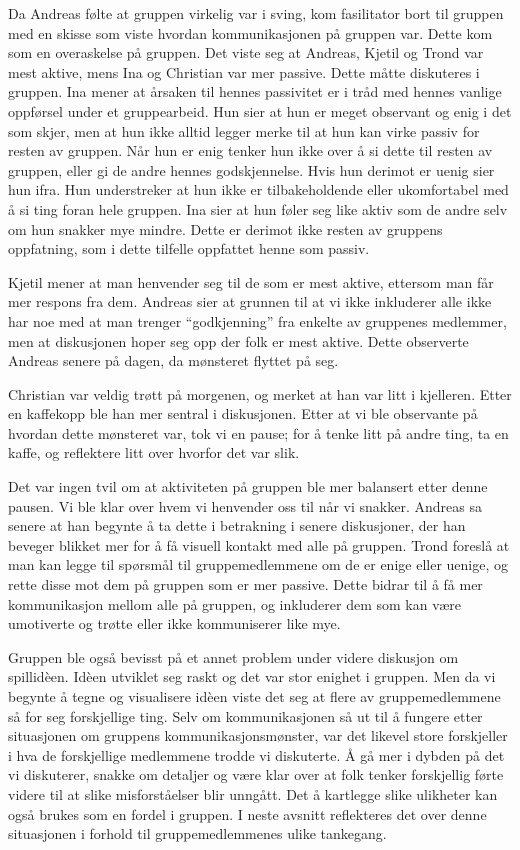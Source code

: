 Da Andreas følte at gruppen virkelig var i sving, kom fasilitator bort til gruppen med en skisse som viste hvordan kommunikasjonen på gruppen var.
Dette kom som en overaskelse på gruppen. Det viste seg at Andreas, Kjetil og Trond var mest aktive, mens Ina og Christian var mer passive. Dette måtte diskuteres i gruppen.
Ina mener at årsaken til hennes passivitet er i tråd med hennes vanlige oppførsel under et gruppearbeid. Hun sier at hun er meget observant og enig i det som skjer, men at hun ikke alltid legger merke til at hun kan virke passiv for resten av gruppen. Når hun er enig tenker hun ikke over å si dette til resten av gruppen, eller gi de andre hennes godskjennelse. Hvis hun derimot er uenig sier hun ifra. Hun understreker at hun ikke er tilbakeholdende eller ukomfortabel med å si ting foran hele gruppen. Ina sier at hun føler seg like aktiv som de andre selv om hun snakker mye mindre. Dette er derimot ikke resten av gruppens oppfatning, som i dette tilfelle oppfattet henne som passiv. 

Kjetil mener at man henvender seg til de som er mest aktive, ettersom man får mer respons fra dem. Andreas sier at grunnen til at vi ikke inkluderer alle ikke har noe med at man trenger “godkjenning” fra enkelte av gruppenes medlemmer, men at diskusjonen hoper seg opp der folk er mest aktive. Dette observerte Andreas senere på dagen, da mønsteret flyttet på seg. 

Christian var veldig trøtt på morgenen, og merket at han var litt i kjelleren. Etter en kaffekopp ble han mer sentral i diskusjonen. Etter at vi ble observante på hvordan dette mønsteret var, tok vi en pause; for å tenke litt på andre ting, ta en kaffe, og reflektere litt over hvorfor det var slik. 

Det var ingen tvil om at aktiviteten på gruppen ble mer balansert etter denne pausen. Vi ble klar over hvem vi henvender oss til når vi snakker. Andreas sa senere at han begynte å ta dette i betrakning i senere diskusjoner, der han beveger blikket mer for å få visuell kontakt med alle på gruppen. Trond foreslå at man kan legge til spørsmål til gruppemedlemmene om de er enige eller uenige, og rette disse mot dem på gruppen som er mer passive. Dette bidrar til å få mer kommunikasjon mellom alle på gruppen, og inkluderer dem som kan være umotiverte og trøtte eller ikke kommuniserer like mye. 

Gruppen ble også bevisst på et annet problem under videre diskusjon om spillidèen. Idèen utviklet seg raskt og det var stor enighet i gruppen. Men da vi begynte å tegne og visualisere idèen viste det seg at flere av gruppemedlemmene så for seg forskjellige ting. Selv om kommunikasjonen så ut til å fungere etter situasjonen om gruppens kommunikasjonsmønster, var det likevel store forskjeller i hva de forskjellige medlemmene trodde vi diskuterte. Å gå mer i dybden på det vi diskuterer, snakke om detaljer og være klar over at folk tenker forskjellig førte videre til at slike misforståelser blir unngått. Det å kartlegge slike ulikheter kan også brukes som en fordel i gruppen. I neste avsnitt reflekteres det over denne situasjonen i forhold til gruppemedlemmenes ulike tankegang.

